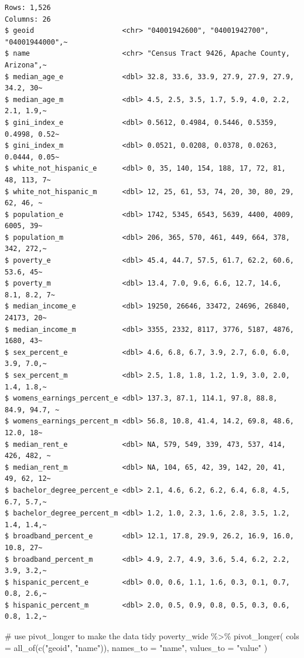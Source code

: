 \documentclass[
  letterpaper,
  DIV=11,
  numbers=noendperiod]{scrreprt}
\newenvironment{Shaded}{\begin{snugshade}}{\end{snugshade}}
\newcommand{\AttributeTok}[1]{\textcolor[rgb]{0.40,0.45,0.13}{#1}}
\newcommand{\CommentTok}[1]{\textcolor[rgb]{0.37,0.37,0.37}{#1}}
\newcommand{\FunctionTok}[1]{\textcolor[rgb]{0.28,0.35,0.67}{#1}}
\newcommand{\NormalTok}[1]{\textcolor[rgb]{0.00,0.23,0.31}{#1}}
\newcommand{\SpecialCharTok}[1]{\textcolor[rgb]{0.37,0.37,0.37}{#1}}
\newcommand{\StringTok}[1]{\textcolor[rgb]{0.13,0.47,0.30}{#1}}
\begin{document}
\begin{verbatim}
Rows: 1,526
Columns: 26
$ geoid                     <chr> "04001942600", "04001942700", "04001944000",~
$ name                      <chr> "Census Tract 9426, Apache County, Arizona",~
$ median_age_e              <dbl> 32.8, 33.6, 33.9, 27.9, 27.9, 27.9, 34.2, 30~
$ median_age_m              <dbl> 4.5, 2.5, 3.5, 1.7, 5.9, 4.0, 2.2, 2.1, 1.9,~
$ gini_index_e              <dbl> 0.5612, 0.4984, 0.5446, 0.5359, 0.4998, 0.52~
$ gini_index_m              <dbl> 0.0521, 0.0208, 0.0378, 0.0263, 0.0444, 0.05~
$ white_not_hispanic_e      <dbl> 0, 35, 140, 154, 188, 17, 72, 81, 48, 113, 7~
$ white_not_hispanic_m      <dbl> 12, 25, 61, 53, 74, 20, 30, 80, 29, 62, 46, ~
$ population_e              <dbl> 1742, 5345, 6543, 5639, 4400, 4009, 6005, 39~
$ population_m              <dbl> 206, 365, 570, 461, 449, 664, 378, 342, 272,~
$ poverty_e                 <dbl> 45.4, 44.7, 57.5, 61.7, 62.2, 60.6, 53.6, 45~
$ poverty_m                 <dbl> 13.4, 7.0, 9.6, 6.6, 12.7, 14.6, 8.1, 8.2, 7~
$ median_income_e           <dbl> 19250, 26646, 33472, 24696, 26840, 24173, 20~
$ median_income_m           <dbl> 3355, 2332, 8117, 3776, 5187, 4876, 1680, 43~
$ sex_percent_e             <dbl> 4.6, 6.8, 6.7, 3.9, 2.7, 6.0, 6.0, 3.9, 7.0,~
$ sex_percent_m             <dbl> 2.5, 1.8, 1.8, 1.2, 1.9, 3.0, 2.0, 1.4, 1.8,~
$ womens_earnings_percent_e <dbl> 137.3, 87.1, 114.1, 97.8, 88.8, 84.9, 94.7, ~
$ womens_earnings_percent_m <dbl> 56.8, 10.8, 41.4, 14.2, 69.8, 48.6, 12.0, 18~
$ median_rent_e             <dbl> NA, 579, 549, 339, 473, 537, 414, 426, 482, ~
$ median_rent_m             <dbl> NA, 104, 65, 42, 39, 142, 20, 41, 49, 62, 12~
$ bachelor_degree_percent_e <dbl> 2.1, 4.6, 6.2, 6.2, 6.4, 6.8, 4.5, 6.7, 5.7,~
$ bachelor_degree_percent_m <dbl> 1.2, 1.0, 2.3, 1.6, 2.8, 3.5, 1.2, 1.4, 1.4,~
$ broadband_percent_e       <dbl> 12.1, 17.8, 29.9, 26.2, 16.9, 16.0, 10.8, 27~
$ broadband_percent_m       <dbl> 4.9, 2.7, 4.9, 3.6, 5.4, 6.2, 2.2, 3.9, 3.2,~
$ hispanic_percent_e        <dbl> 0.0, 0.6, 1.1, 1.6, 0.3, 0.1, 0.7, 0.8, 2.6,~
$ hispanic_percent_m        <dbl> 2.0, 0.5, 0.9, 0.8, 0.5, 0.3, 0.6, 0.8, 1.2,~
\end{verbatim}

\begin{Shaded}
\begin{Highlighting}[]
\CommentTok{\# use pivot\_longer to make the data tidy }
\NormalTok{poverty\_wide }\SpecialCharTok{\%\textgreater{}\%}
  \FunctionTok{pivot\_longer}\NormalTok{(}
    \AttributeTok{cols =} \FunctionTok{all\_of}\NormalTok{(}\FunctionTok{c}\NormalTok{(}\StringTok{"geoid"}\NormalTok{, }\StringTok{"name"}\NormalTok{)),}
    \AttributeTok{names\_to =} \StringTok{"name"}\NormalTok{,}
    \AttributeTok{values\_to =} \StringTok{"value"}
\NormalTok{  )}
\end{Highlighting}
\end{Shaded}
\end{document}

